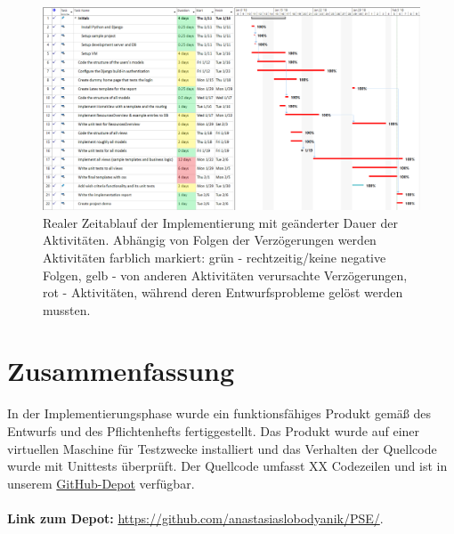 \documentclass[parskip=full,11pt]{scrartcl}
\begin{document}
 \newpage
  \begin{figure}[h]
 	\centering
 	\includegraphics[width=1\textwidth]{res/gannt_real.png}
 	\caption{Realer Zeitablauf der Implementierung mit geänderter Dauer der Aktivitäten. Abhängig von Folgen der Verzögerungen werden Aktivitäten farblich markiert: grün - rechtzeitig/keine negative Folgen, gelb - von anderen Aktivitäten verursachte Verzögerungen, rot - Aktivitäten, während deren Entwurfsprobleme gelöst werden mussten.}
 	\label{ganntnew}
 \end{figure}
 
 
\section{Zusammenfassung}
In der Implementierungsphase wurde ein funktionsfähiges Produkt gemäß des Entwurfs und des Pflichtenhefts fertiggestellt. Das Produkt wurde auf einer virtuellen Maschine für Testzwecke installiert und das Verhalten der Quellcode wurde mit Unittests überprüft. Der Quellcode umfasst XX Codezeilen und ist in unserem \href{https://github.com/anastasiaslobodyanik/PSE/}{GitHub-Depot} verfügbar.\\\\
\textbf{Link zum Depot:} \href{https://github.com/anastasiaslobodyanik/PSE/}{https://github.com/anastasiaslobodyanik/PSE/}.
\end{document}

